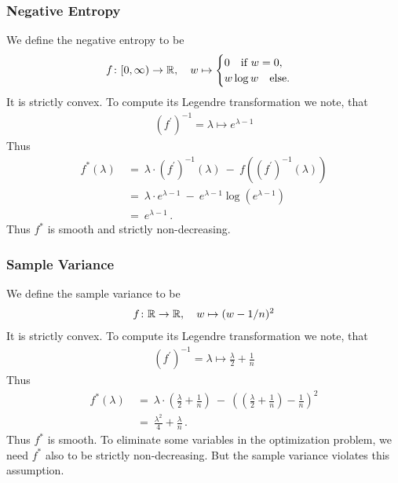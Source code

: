 \subsubsection*{Negative Entropy}
We define the negative entropy to be
\begin{gather}
  f
  \colon
  [0,\infty)
  \to
  \mathbb{R}
  ,\quad
  w
  \mapsto
  \begin{cases}
    0\quad\text{if}\ w=0,\\
    w\log w\quad
    \text{else}.
  \end{cases}
\end{gather}
It is strictly convex. To compute its Legendre transformation we note, that
\begin{gather}
  (f^{'})^{-1}
  =
  \lambda\mapsto
  e^{\lambda-1}
\end{gather}
Thus
  \begin{align*}
  f^*
  (\lambda)
  &
  \ 
  =
  \ 
  \lambda
    \cdot
    (f^{'})^{-1}(\lambda)
  \ 
    -
  \ 
    f
    \left( 
      (f^{'})^{-1}(\lambda)
    \right)
    \\
  &
  \ 
  =
  \ 
  \lambda
    \cdot
  e^{\lambda-1}
  \ 
    -
  \ 
  e^{\lambda-1}
  \log
  \left( 
  e^{\lambda-1}
  \right)
  \\
  &
  \ 
  =
  \ 
  e^{\lambda-1}
  \,.
  \end{align*}
  Thus $f^*$ is smooth and strictly non-decreasing.


  \subsubsection*{Sample Variance}
We define the sample variance to be
\begin{gather}
  f
  \colon
  \mathbb{R}
  \to
  \mathbb{R}
  ,\quad
  w
  \mapsto
  (w-1/n)^2
\end{gather}
It is strictly convex. To compute its Legendre transformation we note, that
\begin{gather}
  (f^{'})^{-1}
  =
  \lambda\mapsto
  \frac{\lambda}{2}
  +
  \frac{1}{n}
\end{gather}
Thus
  \begin{align*}
  f^*
  (\lambda)
  &
  \ 
  =
  \ 
  \lambda
    \cdot
    \left( 
  \frac{\lambda}{2}
  +
  \frac{1}{n}
    \right)
  \ 
    -
  \ 
    \left( 
    \left( 
  \frac{\lambda}{2}
  +
  \frac{1}{n}
    \right)
    -
    \frac{1}{n}
    \right)
    ^2
    \\
  &
  \ 
  =
  \ 
  \frac{\lambda^2}{4}
  +
  \frac{\lambda}{n}
  \,.
  \end{align*}
  Thus $f^*$ is smooth.
  To eliminate some variables in the optimization problem,
  we need $f^*$ also to be
  strictly non-decreasing. But the sample variance violates this assumption.

